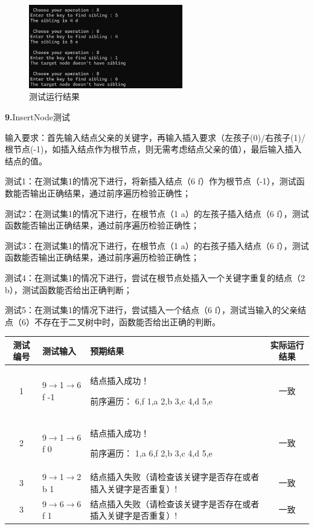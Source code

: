 \documentclass[supercite]{Experimental_Report}
\theoremstyle{definition}
\begin{document}
~\

\begin{figure}[H]
 	\centering
 	\includegraphics[width=0.6\textwidth]{images/二叉树测试8.png}
 	\caption{测试运行结果}
 	\label{txlab}
 \end{figure}

\noindent\textbf{ 9.}InsertNode测试

输入要求：首先输入结点父亲的关键字，再输入插入要求（左孩子(0)/右孩子(1)/根节点(-1)，如插入结点作为根节点，则无需考虑结点父亲的值），最后输入插入结点的值。

测试1：在测试集1的情况下进行，将新插入结点（6 f）作为根节点（-1），测试函数能否输出正确结果，通过前序遍历检验正确性；

测试2：在测试集1的情况下进行，在根节点（1 a）的左孩子插入结点（6 f），测试函数能否输出正确结果，通过前序遍历检验正确性；

测试3：在测试集1的情况下进行，在根节点（1 a）的右孩子插入结点（6 f），测试函数能否输出正确结果，通过前序遍历检验正确性；

测试4：在测试集1的情况下进行，尝试在根节点处插入一个关键字重复的结点（2 b），测试函数能否给出正确判断；

测试5：在测试集1的情况下进行，尝试插入一个结点（6 f），测试当输入的父亲结点（6）不存在于二叉树中时，函数能否给出正确的判断。

\vspace{0.5em}

\begin{tabular}{|c|l|p{6cm}|c|}
	\hline
	测试编号 & 测试输入 & 预期结果 & 实际运行结果 \\
	\hline
	1 & 9$\rightarrow$1$\rightarrow$6 f -1 & 结点插入成功！

前序遍历： 6,f 1,a 2,b 3,c 4,d 5,e & 一致 \\
	\hline
	2 & 9$\rightarrow$1$\rightarrow$6 f 0 & 结点插入成功！

前序遍历：  1,a 6,f 2,b 3,c 4,d 5,e & 一致 \\
	\hline
	3 & 9$\rightarrow$1$\rightarrow$2 b 1 & 结点插入失败（请检查该关键字是否存在或者插入关键字是否重复）! & 一致 \\
	\hline
	3 & 9$\rightarrow$6$\rightarrow$6 f 1 & 结点插入失败（请检查该关键字是否存在或者插入关键字是否重复）! & 一致 \\
	\hline
\end{tabular}
\end{document}
